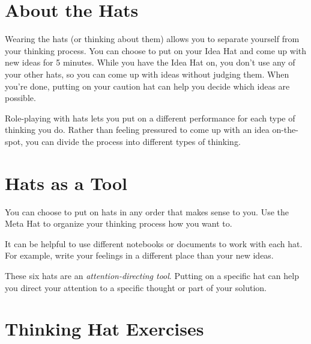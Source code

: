 \newpage

\section*{About the Hats}

Wearing the hats (or thinking about them) allows you to separate yourself from your thinking process. You can choose to put on your Idea Hat and come up with new ideas for 5 minutes. While you have the Idea Hat on, you don't use any of your other hats, so you can come up with ideas without judging them. When you're done, putting on your caution hat can help you decide which ideas are possible.

Role-playing with hats lets you put on a different performance for each type of thinking you do. Rather than feeling pressured to come up with an idea on-the-spot, you can divide the process into different types of thinking.

\section*{Hats as a Tool}

You can choose to put on hats in any order that makes sense to you. Use the Meta Hat to organize your thinking process how you want to.

It can be helpful to use different notebooks or documents to work with each hat. For example, write your feelings in a different place than your new ideas.

These six hats are an \textit{attention-directing tool}. Putting on a specific hat can help you direct your attention to a specific thought or part of your solution.

\newpage 

\section*{Thinking Hat Exercises}

